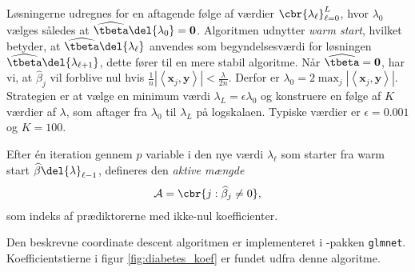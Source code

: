%
Løsningerne udregnes for en aftagende følge af værdier \(\cbr{\lambda_{\ell}}_{\ell = 0}^L\), hvor \(\lambda_0\) vælges således at \(\widehat{\tbeta} \del{\lambda_0} =\mathbf{0}\). 
Algoritmen udnytter \textit{warm start}, hvilket betyder, at \(\widehat{\tbeta} \del{\lambda_\ell}\) anvendes som begyndelsesværdi for løsningen \(\widehat{\tbeta} \del{\lambda_{\ell + 1}}\), dette fører til en mere stabil algoritme. 
Når \(\widehat{\tbeta} = \mathbf{0}\), har vi, at \(\widehat{\beta}_j\) vil forblive nul hvis \(\frac{1}{n} \left\vert \left\langle \mathbf{x}_j, \mathbf{y} \right\rangle \right\vert < \frac{\lambda}{2n}\). Derfor er \( \lambda_0 = 2 \max_j \left\vert \left\langle \mathbf{x}_j, \mathbf{y} \right\rangle \right\vert\).
Strategien er at vælge en minimum værdi \(\lambda_L = \epsilon \lambda_0\) og konstruere en følge af \(K\) værdier af \(\lambda\), som aftager fra \(\lambda_0\) til \(\lambda_L\) på logskalaen.
Typiske værdier er \(\epsilon = 0.001\) og \(K =100\).
%

\begin{defn}
Efter én iteration gennem \(p\) variable i den nye værdi \(\lambda_\ell\) som starter fra warm start \(\widehat{\beta} \del{\lambda}_{\ell -1}\), defineres den \textit{aktive mængde}
\begin{align*}
\mathcal{A} = \cbr{j : \widehat{\beta}_j \neq 0},
\end{align*}
som indeks af prædiktorerne med ikke-nul koefficienter.
\end{defn}
%
%


Den beskrevne coordinate descent algoritmen er implementeret i \Rlang-pakken \texttt{glmnet}.
Koefficientstierne i figur \ref{fig:diabetes_koef} er fundet udfra denne algoritme.
